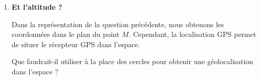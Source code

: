 \documentclass[a4paper]{article}
\begin{document}
\begin{enumerate}
\begin{enumerate}
      \end{enumerate}
    \item \textbf{ Et l'altitude ?}

      Dans la représentation de la question précédente, nous obtenons les coordonnées dans le plan du point $M$. Cependant, la localisation GPS permet de situer le récepteur GPS dans l'espace. 

      Que faudrait-il utiliser à la place des cercles pour obtenir une géolocalisation dans l'espace ? 


  \end{enumerate}
\end{document}
